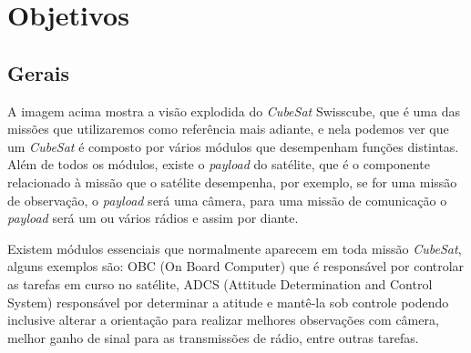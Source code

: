 \section{Objetivos}
\subsection*{Gerais}\label{gerais}

\noindent
\begin{minipage}{\linewidth}
\label{swisscube_exploded_fig}
\end{minipage}

A imagem acima mostra a visão explodida do \textit{CubeSat} Swisscube, que é uma das missões que utilizaremos como referência mais adiante, e nela podemos ver que um \textit{CubeSat} é composto por vários módulos que desempenham funções distintas. Além de todos os módulos, existe o \textit{payload} do satélite, que é o componente relacionado à missão que o satélite desempenha, por exemplo, se for uma missão de observação, o \textit{payload} será uma câmera, para uma missão de comunicação o \textit{payload} será um ou vários rádios e assim por diante. 

Existem módulos essenciais que normalmente aparecem em toda missão \textit{CubeSat}, alguns exemplos são: OBC (On Board Computer) que é responsável por controlar as tarefas em curso no satélite, ADCS (Attitude Determination and Control System) responsável por determinar a atitude e mantê-la sob controle podendo inclusive alterar a orientação para realizar melhores observações com câmera, melhor ganho de sinal para as transmissões de rádio, entre outras tarefas.


